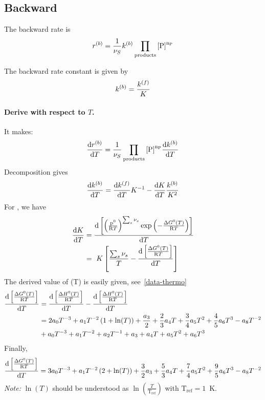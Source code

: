 \subsection{Backward}

The backward rate is
\begin{equation}
\bkwdrate = \frac{1}{\scoef[S]}\bkwdratecons\prodProd
\end{equation}

The backward rate constant is given by
\begin{equation}
\bkwdratecons = \frac{\fwdratecons}{\Eqconst}
\end{equation}

\paragraph{Derive with respect to $T$.}
It makes:
\begin{equation}
\doverdT{\bkwdrate} = \frac{1}{\scoef[S]}\prodProd\doverdT{\bkwdratecons}
\end{equation}
Decomposition gives
\begin{equation}
\doverdT{\bkwdratecons} = \doverdT{\fwdratecons}\Eqconst^{-1} - \doverdT{\Eqconst}\frac{\bkwdratecons}{\Eqconst^{2}}
\label{rateb-decomp}
\end{equation}
For \Eqconst, we have
\begin{equation}
\begin{split}
\doverdT{\Eqconst} &= \doverdT{\left[\left(\frac{\pz}{\Rg T}\right)^{\sum_s \scoef[s]} \exp\left(-\frac{\DgibbsZ(T)}{\Rg T}\right)\right]} \\
                   &= \Eqconst\left[\frac{\sum_s\scoef[s]}{T} - \doverdT{\left[\frac{\DgibbsZ(T)}{\Rg T}\right]}\right]
\end{split}
\end{equation}
The derived value of \DgibbsZ(T) is easily given, see~\ref{data-thermo}
\begin{equation}
\begin{split}
\doverdT{\left[\frac{\DgibbsZ(T)}{\Rg T}\right]} 
        &= \doverdT{\left[\frac{\DenthZ(T)}{\Rg T}\right]} - \doverdT{\left[\frac{\DenthZ(T)}{\Rg T}\right]} \\
        &= 2\tc{0}T^{-3} + \tc{1}T^{-2}\left(1+\ln(T)\right) + \frac{\tc{3}}{2} + \frac{2}{3}\tc{4}T + \frac{3}{4}\tc{5}T^{2} + \frac{4}{5}\tc{6}T^3 - \tc{8}T^{-2}\\
        &+ \tc{0}T^{-3} + \tc{1}T^{-2} + \tc{2}T^{-1} + \tc{3} + \tc{4}T + \tc{5} T^{2} + \tc{6} T^{3}
\end{split}
\end{equation}
Finally,
\begin{equation}
\doverdT{\left[\frac{\DgibbsZ(T)}{\Rg T}\right]} =
        3\tc{0}T^{-3} + \tc{1} T^{-2} \left(2 + \ln(T)\right) + \frac{3}{2} \tc{3} + \frac{5}{3} \tc{4} T
        + \frac{7}{4}\tc{5} T^2 + \frac{9}{5}\tc{6} T^3 - \tc{8} T^{-2}
\end{equation}
\emph{Note:} $\ln(T)$ should be understood as $\ln\left(\frac{T}{\mathrm{T_{ref}}}\right)$ with $\mathrm{T_{ref}} = 1$~K.

